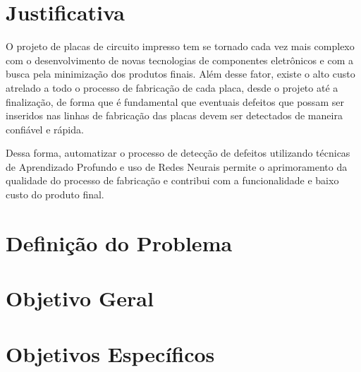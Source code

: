 \section{Justificativa}
O projeto de placas de circuito impresso tem se tornado cada vez mais complexo com o desenvolvimento de novas tecnologias de componentes eletrônicos e com a busca pela minimização dos produtos finais. Além desse fator, existe o alto custo atrelado a todo o processo de fabricação de cada placa, desde o projeto até a finalização, de forma que é fundamental que eventuais defeitos que possam ser inseridos nas linhas de fabricação das placas devem ser detectados de maneira confiável e rápida.

Dessa forma, automatizar o processo de detecção de defeitos utilizando técnicas de Aprendizado Profundo e uso de Redes Neurais permite o aprimoramento da qualidade do processo de fabricação e contribui com a funcionalidade e baixo custo do produto final.

\section{Definição do Problema}



\section{Objetivo Geral}

\section{Objetivos Específicos}
